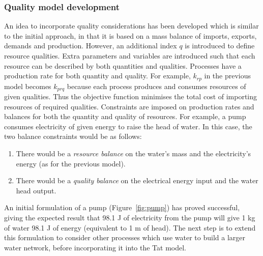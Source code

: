 \subsubsection*{Quality model development}
An idea to incorporate quality considerations has been developed which is similar to the initial approach, in that it is based on a mass balance of imports, exports, demands and production. However, an additional index $q$ is introduced to define resource qualities. Extra parameters and variables are introduced such that each resource can be described by both quantities and qualities. Processes have a production rate for both quantity and quality. For example, $k_{rp}$ in the previous model becomes $k_{prq}$ because each process produces and consumes resources of given qualities. Thus the objective function minimises the total cost of importing resources of required qualities. Constraints are imposed on production rates and balances for both the quantity and quality of resources. For example, a pump consumes electricity of given energy to raise the head of water. In this case, the two balance constraints would be as follows:
\begin{enumerate}
	\item There would be a \emph{resource balance} on the water's mass and the electricity's energy (as for the previous model). 
	\item There would be a \emph{quality balance} on the electrical energy input and the water head output. 
\end{enumerate}	
%
% 

An initial formulation of a pump (Figure~\ref{fig:pump}) has proved successful, giving the expected result that 98.1 J of electricity from the pump will give 1 kg of water 98.1 J of energy (equivalent to 1 m of head). The next step is to extend this formulation to consider other processes which use water to build a larger water network, before incorporating it into the Tat model.

